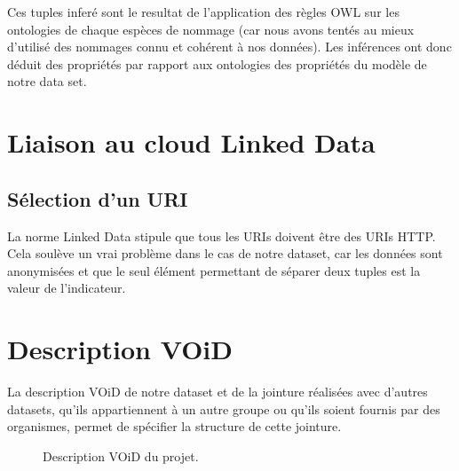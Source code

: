 Ces tuples inferé sont le resultat de l'application des règles OWL sur les ontologies de chaque espèces de nommage (car nous avons tentés au mieux d'utilisé des nommages connu et cohérent à nos données).
Les inférences ont donc déduit des propriétés par rapport aux ontologies des propriétés du modèle de notre data set.

\chapter{Liaison au cloud Linked Data}
\section{Sélection d'un URI}

La norme Linked Data stipule que tous les URIs doivent être des URIs HTTP. Cela soulève un vrai problème dans le cas de notre dataset, car les données sont anonymisées et que le seul élément permettant de séparer deux tuples est la valeur de l'indicateur.

\chapter{Description VOiD}

La description VOiD de notre dataset et de la jointure réalisées avec d'autres datasets, qu'ils appartiennent à un autre groupe ou qu'ils soient fournis par des organismes, permet de spécifier la structure de cette jointure.

\begin{figure}[H]

\caption{Description VOiD du projet.}
\end{figure}
